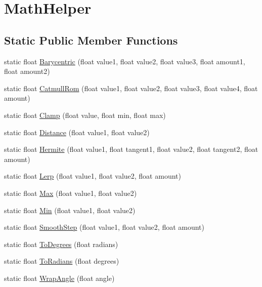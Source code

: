 \hypertarget{classMicrosoft_1_1Xna_1_1Framework_1_1MathHelper}{}\section{Math\+Helper}
\label{classMicrosoft_1_1Xna_1_1Framework_1_1MathHelper}
\subsection*{Static Public Member Functions}
\begin{DoxyCompactItemize}
\item 
static float \hyperlink{classMicrosoft_1_1Xna_1_1Framework_1_1MathHelper_aefbe2bd900fb815ce5d2a500e108c737}{Barycentric} (float value1, float value2, float value3, float amount1, float amount2)
\item 
static float \hyperlink{classMicrosoft_1_1Xna_1_1Framework_1_1MathHelper_ab130aac3772a85111366687061b3e4ab}{Catmull\+Rom} (float value1, float value2, float value3, float value4, float amount)
\item 
static float \hyperlink{classMicrosoft_1_1Xna_1_1Framework_1_1MathHelper_a3411d67322e9401f8f71c79720295773}{Clamp} (float value, float min, float max)
\item 
static float \hyperlink{classMicrosoft_1_1Xna_1_1Framework_1_1MathHelper_a2c508123d5125ac97cf2a9a6eee4e4f8}{Distance} (float value1, float value2)
\item 
static float \hyperlink{classMicrosoft_1_1Xna_1_1Framework_1_1MathHelper_ae4d40e7a074f1c175f5f042a1ad7a12a}{Hermite} (float value1, float tangent1, float value2, float tangent2, float amount)
\item 
static float \hyperlink{classMicrosoft_1_1Xna_1_1Framework_1_1MathHelper_a7cb0930600ea4baa5ad415e877eecd14}{Lerp} (float value1, float value2, float amount)
\item 
static float \hyperlink{classMicrosoft_1_1Xna_1_1Framework_1_1MathHelper_aa49e45ebb38ec4aa4dba566cfd8ea4d7}{Max} (float value1, float value2)
\item 
static float \hyperlink{classMicrosoft_1_1Xna_1_1Framework_1_1MathHelper_a0e662ac930b59edb794a87c025e4787f}{Min} (float value1, float value2)
\item 
static float \hyperlink{classMicrosoft_1_1Xna_1_1Framework_1_1MathHelper_a9bea08308cf8e57cf21eefeb9bbc8e59}{Smooth\+Step} (float value1, float value2, float amount)
\item 
static float \hyperlink{classMicrosoft_1_1Xna_1_1Framework_1_1MathHelper_a0d5a69a94551c5c96293fd29e7c4ff55}{To\+Degrees} (float radians)
\item 
static float \hyperlink{classMicrosoft_1_1Xna_1_1Framework_1_1MathHelper_a0005ad2d07a396df932244af2dc620b8}{To\+Radians} (float degrees)
\item 
static float \hyperlink{classMicrosoft_1_1Xna_1_1Framework_1_1MathHelper_afbca0b6d03e972d0b91fd985a97f497f}{Wrap\+Angle} (float angle)
\end{DoxyCompactItemize}

